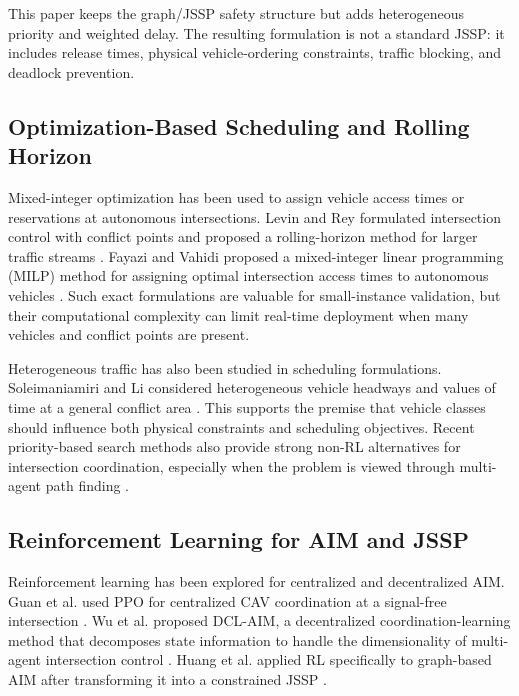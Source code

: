 This paper keeps the graph/JSSP safety structure but adds heterogeneous priority and weighted delay. The resulting formulation is not a standard JSSP: it includes release times, physical vehicle-ordering constraints, traffic blocking, and deadlock prevention.

\subsection{Optimization-Based Scheduling and Rolling Horizon}

Mixed-integer optimization has been used to assign vehicle access times or reservations at autonomous intersections. Levin and Rey formulated intersection control with conflict points and proposed a rolling-horizon method for larger traffic streams \cite{levin2017conflict}. Fayazi and Vahidi proposed a mixed-integer linear programming (MILP) method for assigning optimal intersection access times to autonomous vehicles \cite{fayazi2018mixed}. Such exact formulations are valuable for small-instance validation, but their computational complexity can limit real-time deployment when many vehicles and conflict points are present.

Heterogeneous traffic has also been studied in scheduling formulations. Soleimaniamiri and Li considered heterogeneous vehicle headways and values of time at a general conflict area \cite{soleimaniamiri2019scheduling}. This supports the premise that vehicle classes should influence both physical constraints and scheduling objectives. Recent priority-based search methods also provide strong non-RL alternatives for intersection coordination, especially when the problem is viewed through multi-agent path finding \cite{li2023prioritysearch}.

\subsection{Reinforcement Learning for AIM and JSSP}

Reinforcement learning has been explored for centralized and decentralized AIM. Guan et al. used PPO for centralized CAV coordination at a signal-free intersection \cite{guan2020centralized}. Wu et al. proposed DCL-AIM, a decentralized coordination-learning method that decomposes state information to handle the dimensionality of multi-agent intersection control \cite{wu2019dcl}. Huang et al. applied RL specifically to graph-based AIM after transforming it into a constrained JSSP \cite{huang2023reinforcement}.

